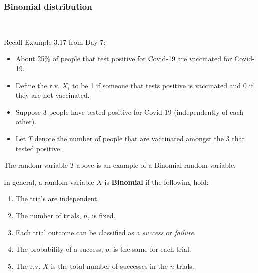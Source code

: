 \documentclass[12pt]{amsart}
\begin{document}
{%

\newpage
\subsubsection{Binomial distribution}  $ \ $



\vspace{0.5cm}
Recall Example 3.17 from Day 7:
\begin{itemize}
\item About 25\% of people that test positive for Covid-19 are vaccinated for Covid-19.
\item Define the r.v. $X_i$ to be 1 if someone that tests positive is vaccinated and 0 if they are not vaccinated. 
\item Suppose 3 people have tested positive for Covid-19 (independently of each other). 
\item Let $T$ denote the number of people that are vaccinated amongst the 3 that tested positive.
\end{itemize}

\vspace{0.5cm}
The random variable $T$ above is an example of a Binomial random variable. \newline

\vspace{0.5cm}

In general, a random variable $X$ is \textbf{Binomial} if the following hold:

\vspace{0.5cm}
\begin{enumerate}
\item The trials are independent.
\item The number of trials, $n$, is fixed. 
\item Each trial outcome can be classified as a \emph{success} or \emph{failure}.
\item The probability of a success, $p$, is the same for each trial.
\item The r.v. $X$ is the total number of successes in the $n$ trials.
\end{enumerate}



}
\end{document}
